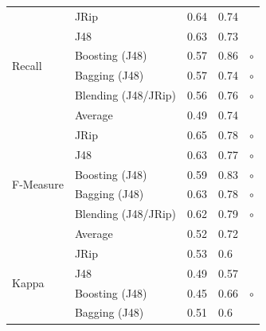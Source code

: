 \begin{table}[ph]
\begin{tabular}{@{}lllll@{}}
\multirow{6}{*}{Recall}    & JRip                & 0.64  & 0.74                                                    &         \\
                           & J48                 & 0.63  & 0.73                                                    &         \\
                           & Boosting (J48)      & 0.57  & 0.86                                                    & $\circ$ \\
                           & Bagging  (J48)      & 0.57  & 0.74                                                    & $\circ$ \\
                           & Blending (J48/JRip) & 0.56  & 0.76                                                    & $\circ$ \\
                           & Average             & 0.49  & 0.74                                                    &         \\ \midrule
\multirow{6}{*}{F-Measure} & JRip                & 0.65  & 0.78                                                    & $\circ$ \\
                           & J48                 & 0.63  & 0.77                                                    & $\circ$ \\
                           & Boosting (J48)      & 0.59  & 0.83                                                    & $\circ$ \\
                           & Bagging  (J48)      & 0.63  & 0.78                                                    & $\circ$ \\
                           & Blending (J48/JRip) & 0.62  & 0.79                                                    & $\circ$ \\
                           & Average             & 0.52  & 0.72                                                    &         \\ \midrule
\multirow{6}{*}{Kappa}     & JRip                & 0.53  & 0.6                                                     &         \\
                           & J48                 & 0.49  & 0.57                                                    &         \\
                           & Boosting (J48)      & 0.45  & 0.66                                                    & $\circ$ \\
                           & Bagging  (J48)      & 0.51  & 0.6                                                     &         \\

\end{tabular}
\end{table}
